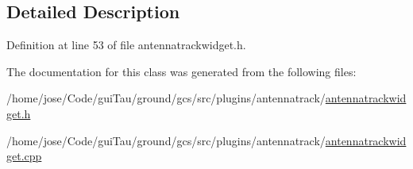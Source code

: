 \subsection{Detailed Description}


Definition at line 53 of file antennatrackwidget.\-h.



The documentation for this class was generated from the following files\-:\begin{DoxyCompactItemize}
\item 
/home/jose/\-Code/gui\-Tau/ground/gcs/src/plugins/antennatrack/\hyperlink{antennatrackwidget_8h}{antennatrackwidget.\-h}\item 
/home/jose/\-Code/gui\-Tau/ground/gcs/src/plugins/antennatrack/\hyperlink{antennatrackwidget_8cpp}{antennatrackwidget.\-cpp}\end{DoxyCompactItemize}
